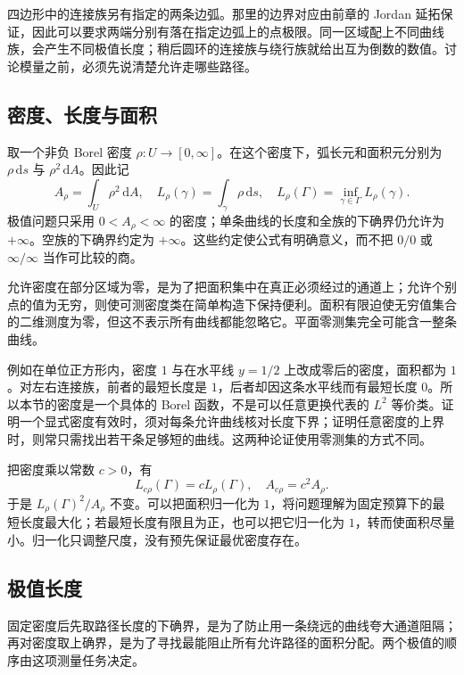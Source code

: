\ProseParagraphBreak
四边形中的连接族另有指定的两条边弧。那里的边界对应由前章的 Jordan 延拓保证，因此可以要求两端分别有落在指定边弧上的点极限。同一区域配上不同曲线族，会产生不同极值长度；稍后圆环的连接族与绕行族就给出互为倒数的数值。讨论模量之前，必须先说清楚允许走哪些路径。

\subsection{密度、长度与面积}
\label{b3:subsec:080302}

取一个非负 Borel 密度 \(\rho:U\rightarrow[0,\infty]\)。在这个密度下，弧长元和面积元分别为 \(\rho\,\mathrm ds\) 与 \(\rho^2\,\mathrm dA\)。因此记
\[
 A_\rho=\int_U\rho^2\,\mathrm dA,\quad
 L_\rho(\gamma)=\int_\gamma\rho\,\mathrm ds,\quad
 L_\rho(\Gamma)=\inf_{\gamma\in\Gamma}L_\rho(\gamma).
\]
极值问题只采用 \(0<A_\rho<\infty\) 的密度；单条曲线的长度和全族的下确界仍允许为 \(+\infty\)。空族的下确界约定为 \(+\infty\)。这些约定使公式有明确意义，而不把 \(0/0\) 或 \(\infty/\infty\) 当作可比较的商。

\ProseParagraphBreak
允许密度在部分区域为零，是为了把面积集中在真正必须经过的通道上；允许个别点的值为无穷，则使可测密度类在简单构造下保持便利。面积有限迫使无穷值集合的二维测度为零，但这不表示所有曲线都能忽略它。平面零测集完全可能含一整条曲线。

\ProseParagraphBreak
例如在单位正方形内，密度 \(1\) 与在水平线 \(y=1/2\) 上改成零后的密度，面积都为 \(1\)。对左右连接族，前者的最短长度是 \(1\)，后者却因这条水平线而有最短长度 \(0\)。所以本节的密度是一个具体的 Borel 函数，不是可以任意更换代表的 \(L^2\) 等价类。证明一个显式密度有效时，须对每条允许曲线核对长度下界；证明任意密度的上界时，则常只需找出若干条足够短的曲线。这两种论证使用零测集的方式不同。

\ProseParagraphBreak
把密度乘以常数 \(c>0\)，有
\[
 L_{c\rho}(\Gamma)=cL_\rho(\Gamma),\quad
 A_{c\rho}=c^2A_\rho.
\]
于是 \(L_\rho(\Gamma)^2/A_\rho\) 不变。可以把面积归一化为 \(1\)，将问题理解为固定预算下的最短长度最大化；若最短长度有限且为正，也可以把它归一化为 \(1\)，转而使面积尽量小。归一化只调整尺度，没有预先保证最优密度存在。

\subsection{极值长度}
\label{b3:subsec:080303}

固定密度后先取路径长度的下确界，是为了防止用一条绕远的曲线夸大通道阻隔；再对密度取上确界，是为了寻找最能阻止所有允许路径的面积分配。两个极值的顺序由这项测量任务决定。

